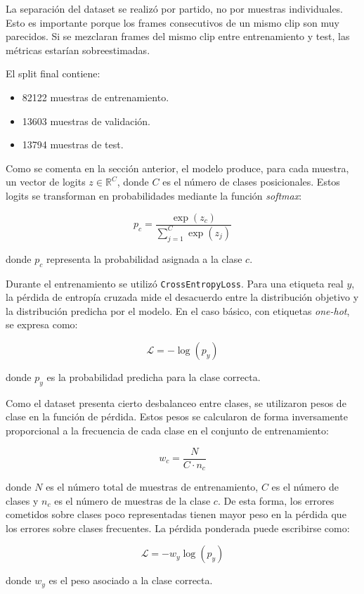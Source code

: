 La separación del dataset se realizó por partido, no por muestras individuales. Esto es importante porque los frames consecutivos de un mismo clip son muy parecidos. Si se mezclaran frames del mismo clip entre entrenamiento y test, las métricas estarían sobreestimadas.

El split final contiene:

\begin{itemize}
    \item 82122 muestras de entrenamiento.
    \item 13603 muestras de validación.
    \item 13794 muestras de test.
\end{itemize}

Como se comenta en la sección anterior, el modelo produce, para cada muestra, un vector de logits \(z \in \mathbb{R}^{C}\), donde \(C\) es el número de clases posicionales. Estos logits se transforman en probabilidades mediante la función \textit{softmax}:

\[
p_c =
\frac{\exp(z_c)}
{\sum_{j=1}^{C} \exp(z_j)}
\]

donde \(p_c\) representa la probabilidad asignada a la clase \(c\).

Durante el entrenamiento se utilizó \texttt{CrossEntropyLoss}. Para una etiqueta real \(y\), la pérdida de entropía cruzada mide el desacuerdo entre la distribución objetivo y la distribución predicha por el modelo. En el caso básico, con etiquetas \textit{one-hot}, se expresa como:

\[
\mathcal{L} = - \log(p_y)
\]

donde \(p_y\) es la probabilidad predicha para la clase correcta.

Como el dataset presenta cierto desbalanceo entre clases, se utilizaron pesos de clase en la función de pérdida. Estos pesos se calcularon de forma inversamente proporcional a la frecuencia de cada clase en el conjunto de entrenamiento:

\[
w_c = \frac{N}{C \cdot n_c}
\]

donde \(N\) es el número total de muestras de entrenamiento, \(C\) es el número de clases y \(n_c\) es el número de muestras de la clase \(c\). De esta forma, los errores cometidos sobre clases poco representadas tienen mayor peso en la pérdida que los errores sobre clases frecuentes. La pérdida ponderada puede escribirse como:

\[
\mathcal{L} = - w_y \log(p_y)
\]

donde \(w_y\) es el peso asociado a la clase correcta.

